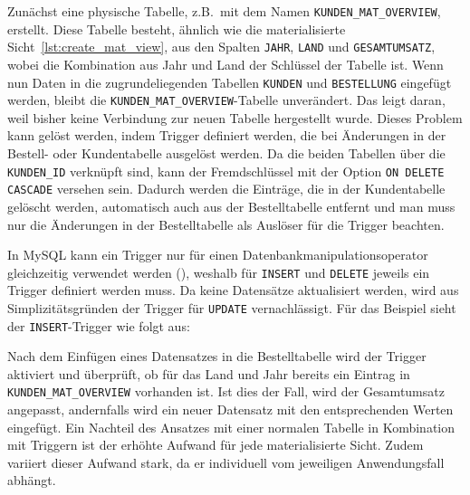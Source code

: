 Zunächst eine physische Tabelle, z.B.\ mit dem Namen \texttt{KUNDEN\_MAT\_OVERVIEW}, erstellt.
Diese Tabelle besteht, ähnlich wie die materialisierte Sicht~\ref{lst:create_mat_view}, aus den Spalten \texttt{JAHR}, \texttt{LAND} und \texttt{GESAMTUMSATZ}, wobei die Kombination aus Jahr und Land der Schlüssel der Tabelle ist.
Wenn nun Daten in die zugrundeliegenden Tabellen \texttt{KUNDEN} und \texttt{BESTELLUNG} eingefügt werden, bleibt die \texttt{KUNDEN\_MAT\_OVERVIEW}-Tabelle unverändert.
Das leigt daran, weil bisher keine Verbindung zur neuen Tabelle hergestellt wurde.
Dieses Problem kann gelöst werden, indem Trigger definiert werden, die bei Änderungen in der Bestell- oder Kundentabelle ausgelöst werden.
Da die beiden Tabellen über die \texttt{KUNDEN\_ID} verknüpft sind, kann der Fremdschlüssel mit der Option \texttt{ON DELETE CASCADE} versehen sein.
Dadurch werden die Einträge, die in der Kundentabelle gelöscht werden, automatisch auch aus der Bestelltabelle entfernt und man muss nur die Änderungen in der Bestelltabelle als Auslöser für die Trigger beachten.

In MySQL kann ein Trigger nur für einen Datenbankmanipulationsoperator gleichzeitig verwendet werden (\cite{mysql_trigger_syntax}), weshalb für \texttt{INSERT} und \texttt{DELETE} jeweils ein Trigger definiert werden muss.
Da keine Datensätze aktualisiert werden, wird aus Simplizitätsgründen der Trigger für \texttt{UPDATE} vernachlässigt.
Für das Beispiel sieht der \texttt{INSERT}-Trigger wie folgt aus:

\vspace{-5pt}


Nach dem Einfügen eines Datensatzes in die Bestelltabelle wird der Trigger aktiviert und überprüft, ob für das Land und Jahr bereits ein Eintrag in \texttt{KUNDEN\_MAT\_OVERVIEW} vorhanden ist.
Ist dies der Fall, wird der Gesamtumsatz angepasst, andernfalls wird ein neuer Datensatz mit den entsprechenden Werten eingefügt.
Ein Nachteil des Ansatzes mit einer normalen Tabelle in Kombination mit Triggern ist der erhöhte Aufwand für jede materialisierte Sicht.
Zudem variiert dieser Aufwand stark, da er individuell vom jeweiligen Anwendungsfall abhängt.

